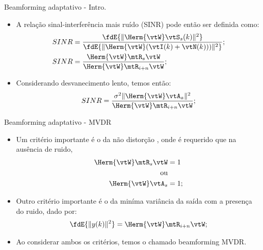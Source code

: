 \begin{frame}{Beamforming adaptativo - Intro.}
	\begin{itemize}
		\item A relação sinal-interferência mais ruído (SINR) pode então ser definida como:
		\begin{align}
		  SINR &= \frac{\fdE\{\|\Herm{\vtW}\vtS_s(k)\|^2\}}{\fdE\{\|\Herm{\vtW}(\vtI(k) + \vtN(k)))\|^2\}};\\
		  SINR &= \frac{\Herm{\vtW}\mtR_s\vtW}{\Herm{\vtW}\mtR_{i+n}\vtW};
		\end{align}
		\item Considerando desvanecimento lento, temos então:
		\begin{equation}
		  SINR = \frac{\sigma^2\|\Herm{\vtW}\vtA_a\|^2}{\Herm{\vtW}\mtR_{i+n}\vtW};
		\end{equation}
	\end{itemize}
\end{frame}

\begin{frame}{Beamforming adaptativo - MVDR }
        \begin{itemize}
                \item Um critério importante é o da não distorção , onde é requerido que na ausência de ruido,
                \begin{align}
                  \Herm{\vtW}\mtR_s\vtW &= 1\\
                  \text{ou}\nonumber\\
                  \Herm{\vtW}\vtA_s &= 1;
                \end{align}
                \item Outro critério importante é o da miníma variância da saída com a presença do ruido, dado por:
                \begin{align}
                  \fdE\{\|y(k)\|^2\} = \Herm{\vtW}\mtR_{i+n}\vtW;
                \end{align}
                \item Ao considerar ambos os critérios, temos o chamado beamforming MVDR.
        \end{itemize}
\end{frame}

